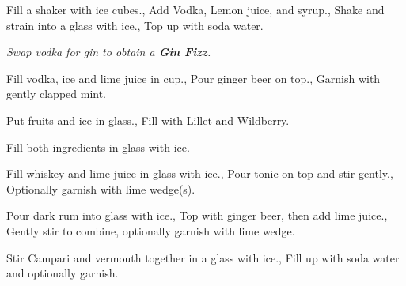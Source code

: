 \documentclass[../main.tex]{subfiles}
\begin{document}

{}
{
	{Fill a shaker with ice cubes.},
	{Add Vodka, Lemon juice, and syrup.},
	{Shake and strain into a glass with ice.},
	{Top up with soda water.}
}

\medskip
\begin{center}
    \textit{Swap vodka for gin to obtain a \textbf{Gin Fizz}.}
\end{center}

\cocktailDivider

{}
{
    {Fill vodka, ice and lime juice in cup.},
    {Pour ginger beer on top.},
    {Garnish with gently clapped mint.}
}

\cocktailDivider

{}
{
    {Put fruits and ice in glass.},
    {Fill with Lillet and Wildberry.}
}

\cocktailDivider

{}
{
    Fill both ingredients in glass with ice.
}

\cocktailDivider

{}
{
    Fill whiskey and lime juice in glass with ice.,
    Pour tonic on top and stir gently.,
    Optionally garnish with lime wedge(s).
}

\cocktailDivider

{}
{
    {Pour dark rum into glass with ice.},
    {Top with ginger beer, then add lime juice.},
    {Gently stir to combine, optionally garnish with lime wedge.}
}

\clearpage

{}
{
    Stir Campari and vermouth together in a glass with ice.,
    Fill up with soda water and optionally garnish.
}

\cocktailDivider
\end{document}
